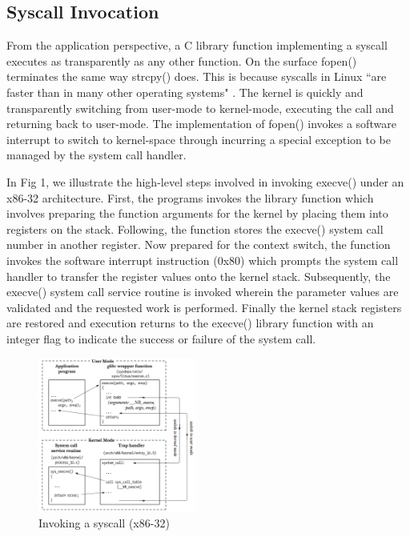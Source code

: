 \documentclass{article}
\begin{document}
\subsection{Syscall Invocation}
From the application perspective, a C library function implementing a 
syscall executes as transparently as any other function. On the surface 
fopen() terminates the same way strcpy() does. This is because syscalls
in Linux ``are faster than in many other operating systems" \citep{Love7}.
The kernel is quickly and transparently switching from user-mode to kernel-mode,
executing the call and returning back to user-mode. The implementation of
fopen() invokes a software interrupt to switch to kernel-space through 
incurring a special exception to be managed by the system call handler.   
\par
In Fig 1, we illustrate the high-level steps involved in invoking execve() 
under an x86-32 architecture. First, the programs invokes the library function
which involves preparing the function arguments for the kernel by placing them 
into registers on the stack. Following, the function stores the execve() system call
number in another register. Now prepared for the context switch, the function invokes
the software interrupt instruction (0x80) which prompts the system
call handler to transfer the register values onto the kernel stack. Subsequently, 
the execve() system call service routine is invoked wherein the parameter 
values are validated and the requested work is performed. Finally the 
kernel stack registers are restored and execution returns to the execve() library 
function with an integer flag to indicate the success or failure of the system call.

\begin{figure}[h]
    \centering
    \includegraphics[width=0.462\textwidth]{img}
    \caption{Invoking a syscall (x86-32)}
    \label{fig:img}
\end{figure}
\end{document}
